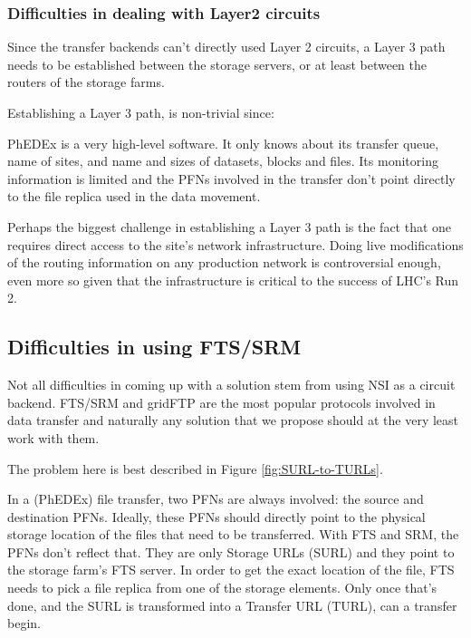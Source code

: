 \subsubsection{Difficulties in dealing with Layer2 circuits}

Since the transfer backends can't directly used Layer 2 circuits, a Layer 3 path needs to be 
established between the storage servers, or at least between the routers of the storage farms.

Establishing a Layer 3 path, is non-trivial since:
\begin{description}[style=unboxed,leftmargin=0cm]
  \item[It requires topology and routing info:] PhEDEx is a very high-level software. It only 
  knows about its transfer queue, name of sites, and name and sizes of datasets, blocks and 
  files. Its monitoring information is limited and the PFNs involved in the transfer don't 
  point directly to the file replica used in the data movement. 
  \item[Direct access to the site's network:] Perhaps the biggest challenge in establishing 
  a Layer 3 path is the fact that one requires direct access to the site's network infrastructure.
  Doing live modifications of the routing information on any production network is controversial 
  enough, even more so given that the infrastructure is critical to the success of LHC's 
  Run 2.
\end{description}

\subsection{Difficulties in using FTS/SRM}

Not all difficulties in coming up with a solution stem from using NSI as a circuit backend.
FTS/SRM and gridFTP are the most popular protocols involved in data transfer and naturally 
any solution that we propose should at the very least work with them. 

The problem here is best described in Figure \ref{fig:SURL-to-TURLs}.

In a (PhEDEx) file transfer, two PFNs are always involved: the source and destination PFNs. 
Ideally, these PFNs should directly point to the physical storage location 
of the files that need to be transferred. With FTS and SRM, the PFNs don't reflect that. 
They are only Storage URLs (SURL) and they point to the storage farm's FTS server. 
In order to get the exact location of the file, FTS needs to pick a file replica from one 
of the storage elements. Only once that's done, and the SURL is transformed into a Transfer 
URL (TURL), can a transfer begin.

